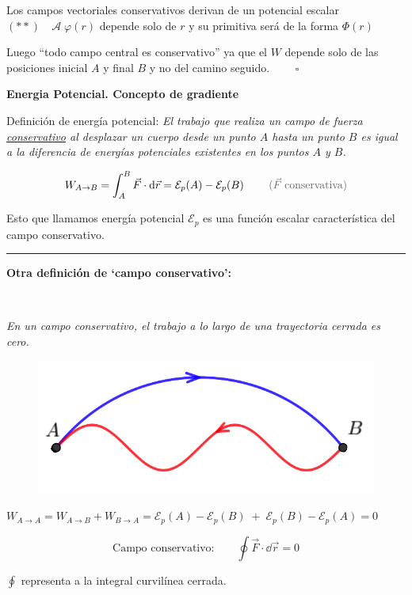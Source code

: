 \begin{small}
\begin{myexampleblock}{Los campos vectoriales conservativos derivan de un potencial escalar}
\textcolor{gris}{
 $(**)\quad \mathcal A\; \varphi(r)$ depende solo de $r$ y su primitiva será de la forma $\Phi(r)$ }

\vspace{2mm} Luego ``todo campo central es conservativo'' ya que el $W$ depende solo de las posiciones inicial $A$ y final $B$ y no del camino seguido. $\qquad \square$

\vspace{2mm} \textbf{Energia Potencial. Concepto de gradiente}

\vspace{2mm} Definición de energía potencial: \emph{El trabajo que realiza un campo de fuerza \underline{conservativo} al desplazar un cuerpo desde un punto $A$ hasta un punto $B$ es igual a la diferencia de energías potenciales existentes en los puntos $A$ y $B$.}

\begin{equation}
\label{Ener-poten}
W_{A\to B}=\int_A^B \vec F \cdot \dd \vec r = \mathcal E_p(A)- \mathcal E_p(B)\; \qquad \textcolor{gris}{(\vec F\; \text{conservativa})}	
\end{equation}

Esto que llamamos energía potencial $ \mathcal E_p$ es una función escalar característica del campo conservativo.

\vspace{2mm}
\rule{150pt}{0.4pt} 

\textbf{Otra definición de `campo conservativo':} 

\begin{multicols}{2}
$\,$

\emph{En un campo conservativo, el trabajo a lo largo de una trayectoria cerrada es cero.}
\begin{figure}[H]
		\centering
		\includegraphics[width=.3\textwidth]{imagenes/img02-13.png}
		\end{figure}
\end{multicols}

$W_{A\to A}=W_{A\to B}+W_{B \to A}=\mathcal E_p(A)-\mathcal E_p(B) \;+ \; \mathcal E_p(B)-\mathcal E_p(A)=0$

$$ \text{Campo conservativo:}\qquad \oint \vec F \cdot \dd \vec r =0$$

\textcolor{gris}{$\oint$ representa a la integral curvilínea cerrada.}


\end{myexampleblock}
\end{small}
